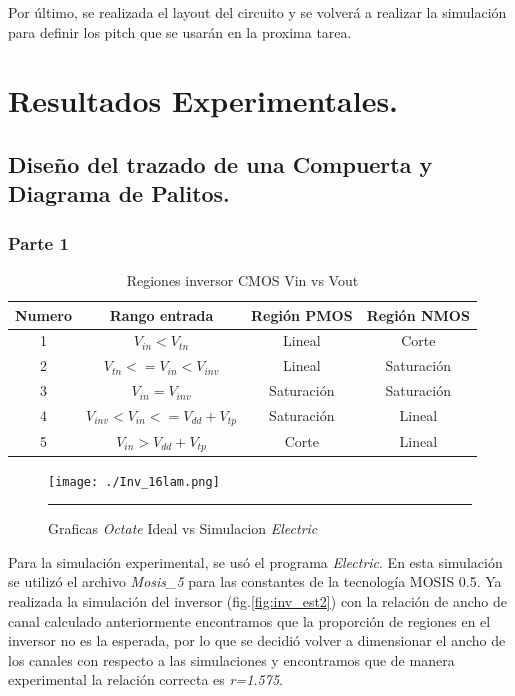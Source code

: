 \documentclass[12pt,a4paper]{article} %
\begin{document}
Por último, se realizada el layout del circuito y se volverá a realizar la simulación para definir los pitch que se usarán en la proxima tarea.

\section{Resultados Experimentales.}


\subsection{Diseño del trazado de una Compuerta y Diagrama de Palitos.}

\subsubsection{Parte 1}




\begin{table}\label{table:Tabla_polarizacion}
\begin{center}
\begin{tabular}{c||c||c||c}
Numero & Rango entrada & Región PMOS & Región NMOS\\
\hline
\hline
1 & $V_{in}<V_{tn}$ & Lineal & Corte \\
2 & $V_{tn}<=V_{in}<V_{inv}$ & Lineal & Saturación \\
3 & $V_{in}=V_{inv}$ & Saturación & Saturación\\
4 & $V_{inv}<V_{in}<=V_{dd}+V_{tp}$ & Saturación & Lineal\\
5 & $V_{in}>V_{dd}+V_{tp}$ & Corte & Lineal\\
\hline
\end{tabular}
\caption{Regiones inversor CMOS Vin vs Vout}
\end{center}
\end{table}


\begin{figure}[htbp]
  \centering
    \texttt{[image: ./Inv\_16lam.png]}
    \rule{35em}{0.5pt}
  \caption[IdealvsSim]{Graficas \textit{Octate} Ideal vs Simulacion \textit{Electric}}
  \label{fig:inv_est}
\end{figure}

Para la simulación experimental, se usó el programa \textit{Electric}. En esta simulación se utilizó el archivo \textit{Mosis\_5} para las constantes de la tecnología MOSIS 0.5. Ya realizada la simulación del inversor (fig.\ref{fig:inv_est2}) con la relación de ancho de canal calculado anteriormente encontramos que la proporción de regiones en el inversor no es la esperada, por lo que se decidió volver a dimensionar el ancho de los canales con respecto a las simulaciones y encontramos que de manera experimental la relación correcta es \textit{r=1.575}. 
\end{document}
